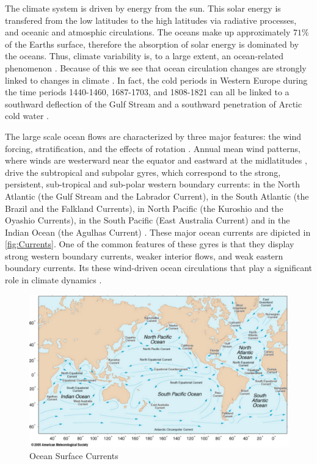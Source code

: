 The climate system is driven by energy from the sun. This solar energy is
transfered from the low latitudes to the high latitudes via radiative processes,
and oceanic and atmosphic circulations. The oceans make up approximately $71\%$
of the Earths surface, therefore the absorption of solar energy is dominated by
the oceans. Thus, climate variability is, to a large extent, an ocean-related
phenomenon \cite{Siedler01}. Because of this we see that ocean circulation
changes are strongly linked to changes in climate \cite{Morner95, Siedler01}. In
fact, the cold periods in Western Europe during the time periods 1440-1460,
1687-1703, and 1808-1821 can all be linked to a southward deflection of the Gulf
Stream and a southward penetration of Arctic cold water \cite{Morner95}.


The large scale ocean flows are characterized by three major features: the wind
forcing, stratification, and the effects of rotation \cite{Majda, Vallis06}.
Annual mean wind patterns, where winds are westerward near the equator and
eastward at the midlatitudes \cite{Dijkstra08}, drive the subtropical and
subpolar gyres, which correspond to the strong, persistent, sub-tropical and
sub-polar western boundary currents: in the North Atlantic (the Gulf Stream and
the Labrador Current), in the South Atlantic (the Brazil and the Falkland
Currents), in North Pacific (the Kuroshio and the Oyashio Currents), in the
South Pacific (East Australia Current) and in the Indian Ocean (the Agulhas
Current) \cite{Dijkstra08,Vallis06}. These major ocean currents are dipicted in
\autoref{fig:Currents}. One of the common features of these gyres is that they
display strong western boundary currents, weaker interior flows, and weak
eastern boundary currents. Its these wind-driven ocean circulations that play a
significant role in climate dynamics \cite{Dijkstra05,Ghil08}.

\begin{figure}%
  \begin{center}
    \includegraphics[scale=0.5]{Currents.pdf}
    \caption{Ocean Surface Currents}
    \label{fig:Currents}
  \end{center}
\end{figure}

